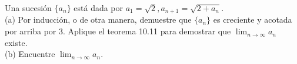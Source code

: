 \item Una sucesión $\{a_n\}$ está dada por $a_1 = \sqrt{2}, a_{n+1} = \sqrt{2 + a_n}$. \\
    (a) Por inducción, o de otra manera, demuestre que $\{a_n\}$ es creciente y acotada por arriba por 3. Aplique el teorema 10.11 para demostrar que $\lim_{n \to \infty} a_n$ existe. \\
    (b) Encuentre $\lim_{n \to \infty} a_n$.
